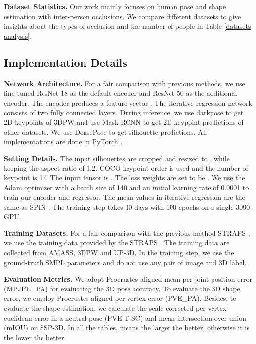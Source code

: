 \documentclass[journal]{IEEEtran}
\begin{document}
\begin{table*}[htbp]
\begin{center}
\label{table:total}
\end{center}
\end{table*}

\noindent\textbf{Dataset Statistics.} Our work mainly focuses on human pose and shape estimation with inter-person occlusions. We compare different datasets to give insights about the types of occlusion and the number of people in Table \ref{datasets analysis}.

\subsection{Implementation Details}
\noindent\textbf{Network Architecture.} For a fair comparison with previous methods, we use fine-tuned  ResNet-18 \cite{he2016deep} as the default encoder and ResNet-50 as the additional encoder. The encoder produces a feature vector . The iterative regression network consists of two fully connected layers. During inference, we use darkpose \cite{Zhang_2020_CVPR} to get 2D keypoints of 3DPW and use Mask-RCNN \cite{he2017mask} to get 2D keypoint predictions of other datasets. We use DensePose \cite{guler2018densepose} to get silhouette predictions. All implementations are done in PyTorch \cite{paszke2019pytorch}. 


\noindent\textbf{Setting Details.} The input silhouettes are cropped and resized to , while keeping the aspect ratio of 1.2. COCO keypoint order is used and the number of keypoint is 17. The input tensor is . The loss weights are set to be  . We use the Adam optimizer \cite{kingma2014adam} with a batch size of 140 and an initial learning rate of 0.0001 to train our encoder and regressor. The mean values in iterative regression are the same as SPIN \cite{kolotouros2019spin}. The training step takes 10 days with 100 epochs on a single 3090 GPU.

\noindent\textbf{Training Datasets.} For a fair comparison with the previous method STRAPS \cite{STRAPS2020BMVC}, we use the training data provided by the STRAPS \cite{STRAPS2020BMVC}. The training data are collected from AMASS, 3DPW and UP-3D. In the training step, we use the ground-truth SMPL parameters and do not use any pair of image and 3D label.


\noindent\textbf{Evaluation Metrics.} We adopt Procrustes-aligned \cite{mehta2017monocular} mean per joint position error (MPJPE\_PA) for evaluating the 3D pose accuracy. To evaluate the 3D shape error, we employ Procrustes-aligned per-vertex error (PVE\_PA). Besides, to evaluate the shape estimation, we calculate the scale-corrected per-vertex euclidean error in a neutral pose (PVE-T-SC) and mean intersection-over-union (mIOU) on SSP-3D. In all the tables,  means the larger the better, otherwise it is the lower the better.
\end{document}
